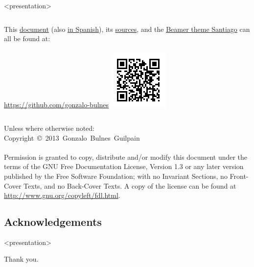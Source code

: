   \begin{frame}<presentation>{\insertsubsection}

    \footnotesize
      \begin{columns}
          This \href{https://github.com/gonzalo-bulnes/you-dont-know-everything/raw/master/YDNE.pdf}{document} (also \href{https://github.com/gonzalo-bulnes/you-dont-know-everything/raw/master/YDNE-es.pdf}{in Spanish}), its \href{https://github.com/gonzalo-bulnes/you-dont-know-everything}{sources}, and the \href{https://github.com/gonzalo-bulnes/santiago-beamer-theme}{Beamer theme Santiago} can all be found at:\\~\\
          \url{https://github.com/gonzalo-bulnes}
        \hfill\includegraphics[width=\textwidth]{../images/sources-talk.png}
      \end{columns}
    \normalsize

    \scriptsize{Unless where otherwise noted:}\\
    \noindent\scriptsize{Copyright~\copyright~2013~Gonzalo~Bulnes~Guilpain}\\~\\

    \scriptsize{Permission is granted to copy, distribute and/or modify this document
    under the terms of the GNU Free Documentation License, Version 1.3
    or any later version published by the Free Software Foundation;
    with no Invariant Sections, no Front-Cover Texts, and no Back-Cover Texts.
    A copy of the license can be found at \url{http://www.gnu.org/copyleft/fdl.html}.}
  \end{frame}

%
\subsection{Acknowledgements}

  \begin{frame}<presentation>
    \vspace{0mm}
    \begin{center}
      Thank you.
    \end{center}
  \end{frame}
